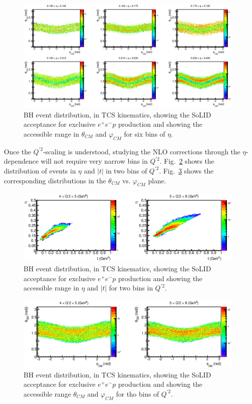 \begin{figure}[t]
\includegraphics[scale=0.8]{theta_phi_CM_etabin.eps}
\caption{\small{BH event distribution, in TCS kinematics, showing the SoLID
acceptance for exclusive $e^+e^-p$ production and showing the accessible range
in $\theta_{CM}$ and $\varphi_{CM}$ for six bins of $\eta$.}}
\label{fig:theta_phi_CM_etabin}
\end{figure}

Once the $Q^{\prime 2}$-scaling is understood, studying the NLO corrections
through the $\eta$-dependence will not require very narrow bins in
$Q^{\prime 2}$. Fig.~\ref{fig:t_eta_Q2bin} shows the distribution of events
in $\eta$ and $|t|$ in two bins of $Q^{\prime 2}$.
Fig.~\ref{fig:theta_phi_CM_Q2bin} shows the corresponding distributions in
the $\theta_{CM}$ vs. $\varphi_{CM}$ plane.

\begin{figure}[t]
\includegraphics[scale=0.7]{t_eta_Q2bin.eps}
\caption{\small{BH event distribution, in TCS kinematics, showing the SoLID
acceptance for exclusive $e^+e^-p$ production and showing the accessible
range in $\eta$ and $|t|$ for two bins in $Q^{\prime 2}$.}}
\label{fig:t_eta_Q2bin}
\end{figure}

\begin{figure}[t]
\includegraphics[scale=0.7]{theta_phi_CM_Q2bin.eps}
\caption{\small{BH event distribution, in TCS kinematics, showing the SoLID
acceptance for exclusive $e^+e^-p$ production and showing the accessible
range $\theta_{CM}$ and $\varphi_{CM}$ for tho bins of $Q^{\prime 2}$.}}
\label{fig:theta_phi_CM_Q2bin}
\end{figure}


